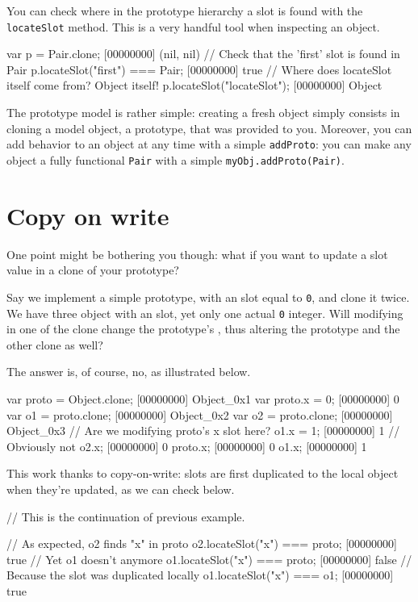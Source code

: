You can check where in the prototype hierarchy a slot is found with
the \lstinline{locateSlot} method. This is a very
handful tool when inspecting an object.

\begin{urbiscript}
var p = Pair.clone;
[00000000] (nil, nil)
// Check that the 'first' slot is found in Pair
p.locateSlot("first") === Pair;
[00000000] true
// Where does locateSlot itself come from? Object itself!
p.locateSlot("locateSlot");
[00000000] Object
\end{urbiscript}

The prototype model is rather simple: creating a fresh object simply
consists in cloning a model object, a prototype, that was provided to
you.  Moreover, you can add behavior to an object at any time with a
simple \lstinline{addProto}: you can make any object a fully
functional \lstinline|Pair| with a simple
\lstinline|myObj.addProto(Pair)|.

\section{Copy on write}

One point might be bothering you though: what if you want to update a
slot value in a clone of your prototype?

Say we implement a simple prototype, with an  slot equal to
\lstinline|0|, and clone it twice. We have three object with an
 slot, yet only one actual \lstinline|0| integer. Will
modifying  in one of the clone change the prototype's ,
thus altering the prototype and the other clone as well?

The answer is, of course, no, as illustrated below.

\begin{urbiscript}
var proto = Object.clone;
[00000000] Object_0x1
var proto.x = 0;
[00000000] 0
var o1 = proto.clone;
[00000000] Object_0x2
var o2 = proto.clone;
[00000000] Object_0x3
// Are we modifying proto's x slot here?
o1.x = 1;
[00000000] 1
// Obviously not
o2.x;
[00000000] 0
proto.x;
[00000000] 0
o1.x;
[00000000] 1
\end{urbiscript}

This work thanks to copy-on-write: slots are first duplicated to the
local object when they're updated, as we can check below.

\begin{urbiscript}[firstnumber=last]
// This is the continuation of previous example.

// As expected, o2 finds "x" in proto
o2.locateSlot("x") === proto;
[00000000] true
// Yet o1 doesn't anymore
o1.locateSlot("x") === proto;
[00000000] false
// Because the slot was duplicated locally
o1.locateSlot("x") === o1;
[00000000] true
\end{urbiscript}

